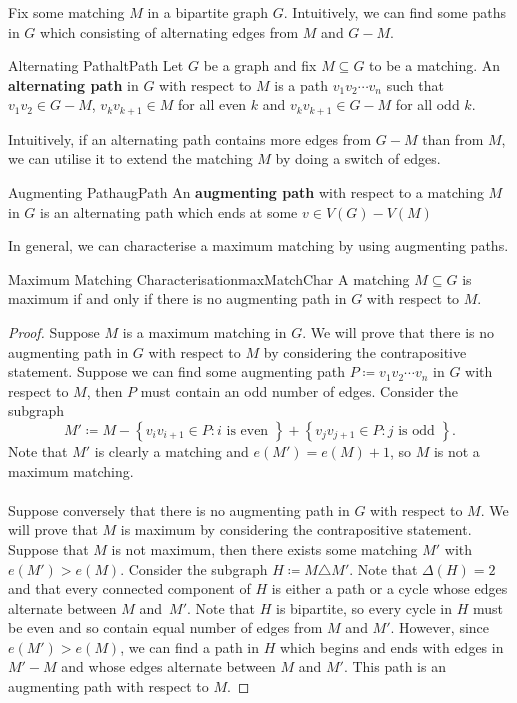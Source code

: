 \documentclass[math]{amznotes}
\theoremstyle{remark}
\begin{document}
Fix some matching $M$ in a bipartite graph $G$. Intuitively, we can find some paths in $G$ which consisting of alternating edges from $M$ and $G - M$.
\begin{dfnbox}{Alternating Path}{altPath}
    Let $G$ be a graph and fix $M \subseteq G$ to be a matching. An {\color{red} \textbf{alternating path}} in $G$ with respect to $M$ is a path $v_1v_2\cdots v_n$ such that $v_1v_2 \in G - M$, $v_kv_{k + 1} \in M$ for all even $k$ and $v_kv_{k + 1} \in G - M$ for all odd $k$.
\end{dfnbox}
Intuitively, if an alternating path contains more edges from $G - M$ than from $M$, we can utilise it to extend the matching $M$ by doing a switch of edges.
\begin{dfnbox}{Augmenting Path}{augPath}
    An {\color{red} \textbf{augmenting path}} with respect to a matching $M$ in $G$ is an alternating path which ends at some $v \in V(G) - V(M)$
\end{dfnbox}
In general, we can characterise a maximum matching by using augmenting paths.
\begin{thmbox}{Maximum Matching Characterisation}{maxMatchChar}
    A matching $M \subseteq G$ is maximum if and only if there is no augmenting path in $G$ with respect to $M$.
    \tcblower
    \begin{proof}
        Suppose $M$ is a maximum matching in $G$. We will prove that there is no augmenting path in $G$ with respect to $M$ by considering the contrapositive statement. Suppose we can find some augmenting path $P \coloneqq v_1v_2\cdots v_n$ in $G$ with respect to $M$, then $P$ must contain an odd number of edges. Consider the subgraph
        \begin{equation*}
            M' \coloneqq M - \left\{v_iv_{i + 1} \in P \colon i \textrm{ is even }\right\} + \left\{v_jv_{j + 1} \in P 
            \colon j \textrm{ is odd }\right\}.
        \end{equation*}
        Note that $M'$ is clearly a matching and $e(M') = e(M) + 1$, so $M$ is not a maximum matching.
        \\\\
        Suppose conversely that there is no augmenting path in $G$ with respect to $M$. We will prove that $M$ is maximum by considering the contrapositive statement. Suppose that $M$ is not maximum, then there exists some matching $M'$ with $e(M') > e(M)$. Consider the subgraph $H \coloneqq M \triangle M'$. Note that $\Delta(H) = 2$ and that every connected component of $H$ is either a path or a cycle whose edges alternate between $M$ and~$M'$. Note that $H$ is bipartite, so every cycle in $H$ must be even and so contain equal number of edges from $M$ and $M'$. However, since $e(M') > e(M)$, we can find a path in $H$ which begins and ends with edges in $M' - M$ and whose edges alternate between $M$ and $M'$. This path is an augmenting path with respect to $M$.
    \end{proof}
\end{thmbox}
\end{document}
